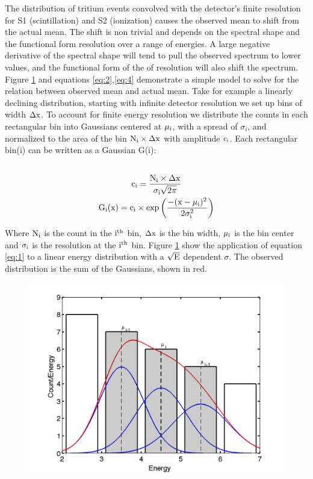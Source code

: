 The distribution of tritium events convolved with the detector's finite resolution for S1 (scintillation) and S2 (ionization) causes the observed mean to shift from the actual mean. The shift is non trivial and depends on the spectral shape and the functional form resolution over a range of energies. A large negative derivative of the spectral shape will tend to pull the observed spectrum to lower values, and the functional form of the of resolution will also shift the spectrum. Figure \ref{fig:exp_int} and equations \ref{eq:2},\ref{eq:4} demonstrate a simple model to solve for the relation between observed mean and actual mean. Take for example a linearly declining distribution, starting with infinite detector resolution we set up bins of width $\rm \Delta x$. To account for finite energy resolution we distribute the counts in each rectangular bin into Gaussians centered at $\rm \mu_i$, with a spread of $\sigma_i$, and normalized to the area of the bin $\rm N_i \times \Delta x $ with amplitude $\rm c_i$. Each rectangular bin(i) can be written as a Gaussian G(i): \\ 
\begin{multline}
\\ \rm c_i=\frac{N_i \times \Delta x}{\sigma_i\sqrt{2\pi}} \\
\rm G_{i}(x) = c_i \times exp\left(\frac{-(x-\mu_i)^2}{2\sigma_i^2}\right)\\
\label{eq:1}
\end{multline}


Where $\rm N_i$ is the count in the $\rm i^{th}$ bin, $\rm \Delta x$ is the bin width, $\rm \mu_i$ is the bin center and $\rm \sigma_i$ is the resolution at the $\rm i^{th}$ bin. Figure \ref{fig:exp_int} show the application of equation \ref{eq:1} to a linear energy distribution with a $\rm \sqrt{E}$ dependent $\sigma$. The observed distribution is the sum of the Gaussians, shown in red.

 \begin{figure}[h!]\centering
\includegraphics[width=130mm]{Chapter_Flucs/Figures/example_integral}
\caption{}
\label{fig:exp_int}
\end{figure}


